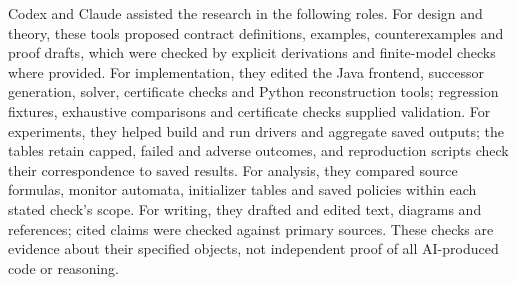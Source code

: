 \documentclass[11pt]{article}
\begin{document}
Codex and Claude assisted the research in the following roles. For design and theory, these tools proposed contract definitions, examples, counterexamples and proof drafts, which were checked by explicit derivations and finite-model checks where provided. For implementation, they edited the Java frontend, successor generation, solver, certificate checks and Python reconstruction tools; regression fixtures, exhaustive comparisons and certificate checks supplied validation. For experiments, they helped build and run drivers and aggregate saved outputs; the tables retain capped, failed and adverse outcomes, and reproduction scripts check their correspondence to saved results. For analysis, they compared source formulas, monitor automata, initializer tables and saved policies within each stated check's scope. For writing, they drafted and edited text, diagrams and references; cited claims were checked against primary sources. These checks are evidence about their specified objects, not independent proof of all AI-produced code or reasoning.


\clearpage

\end{document}
